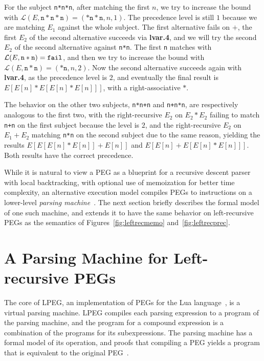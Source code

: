 For the subject {\tt n*n*n}, after matching the first $n$, we try to
increase the bound with $\mathcal{L}(E,\mathtt{n*n*n}) =
(\mathtt{*n*n},n,1)$. The precedence level is still $1$ because we are
matching $E_1$ against the whole subject. The first alternative fails
on $+$, the first $E_2$ of the second alternative succeeds via {\bf
  lvar.4}, and we will try the second $E_2$ of the second alternative
against {\tt n*n}. The first {\tt n} matches with
$\mathcal{L}(E,\mathtt{n*n}) = \Nothing$, and then we try to increase
the bound with $\mathcal{L}(E,\mathtt{n*n}) = (\mathtt{*n},n,2)$. Now
the second alternative succeeds again with {\bf lvar.4}, as the
precedence level is $2$, and eventually the final result is
$E[E[n]*E[E[n]*E[n]]]$, with a right-associative $*$.

The behavior on the other two subjects, {\tt n*n+n} and {\tt n+n*n},
are respectively analogous to the first two, with the right-recursive
$E_2$ on $E_2*E_2$ failing to match {\tt n+n} on the first subject
because the level is $2$, and the right-recursive $E_2$ on $E_1+E_2$
matching {\tt n*n} on the second subject due to the same reason,
yielding the results $E[E[E[n]*E[n]]+E[n]]$ and
$E[E[n]+E[E[n]*E[n]]]$. Both results have the correct precedence.

While it is natural to view a PEG as a blueprint for a recursive
descent parser with local backtracking, with optional use of
memoization for better time complexity, an alternative execution
model compiles PEGs to instructions on a lower-level {\em parsing
  machine}~\cite{dls:lpeg}. The next section briefly describes the
formal model of one such machine, and extends it to have the same
behavior on left-recursive PEGs as the semantics of
Figures~\ref{fig:leftrecmemo} and~\ref{fig:leftrecprec}.

\section{A Parsing Machine for Left-recursive PEGs}
\label{sec:machine}

The core of LPEG, an implementation of PEGs for the Lua
language~\cite{roberto:lpeg}, is a virtual parsing machine. LPEG
compiles each parsing expression to a program of the parsing machine,
and the program for a compound expression is a combination of the
programs for its subexpressions. The parsing machine has a formal
model of its operation, and proofs that compiling a PEG yields a
program that is equivalent to the original PEG~\cite{dls:lpeg}.

